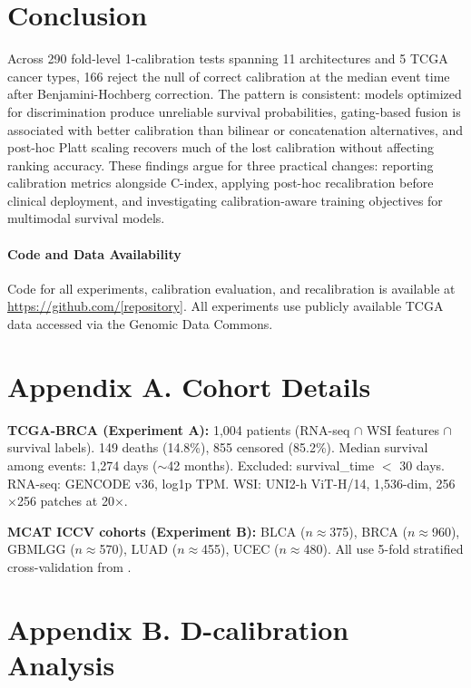 \documentclass[pmlr]{jmlr}
\begin{document}
\section{Conclusion}

Across 290 fold-level 1-calibration tests spanning 11 architectures and 5 TCGA cancer types, 166 reject the null of correct calibration at the median event time after Benjamini-Hochberg correction. The pattern is consistent: models optimized for discrimination produce unreliable survival probabilities, gating-based fusion is associated with better calibration than bilinear or concatenation alternatives, and post-hoc Platt scaling recovers much of the lost calibration without affecting ranking accuracy. These findings argue for three practical changes: reporting calibration metrics alongside C-index, applying post-hoc recalibration before clinical deployment, and investigating calibration-aware training objectives for multimodal survival models.

\paragraph{Code and Data Availability}
Code for all experiments, calibration evaluation, and recalibration is available at \url{https://github.com/[repository]}. All experiments use publicly available TCGA data accessed via the Genomic Data Commons.



\appendix
\section*{Appendix A. Cohort Details}

\textbf{TCGA-BRCA (Experiment A):} 1,004 patients (RNA-seq $\cap$ WSI features $\cap$ survival labels). 149 deaths (14.8\%), 855 censored (85.2\%). Median survival among events: 1,274 days ($\sim$42 months). Excluded: survival\_time $<$ 30 days. RNA-seq: GENCODE v36, log1p TPM. WSI: UNI2-h ViT-H/14, 1,536-dim, 256$\times$256 patches at 20$\times$.

\textbf{MCAT ICCV cohorts (Experiment B):} BLCA ($n$$\approx$375), BRCA ($n$$\approx$960), GBMLGG ($n$$\approx$570), LUAD ($n$$\approx$455), UCEC ($n$$\approx$480). All use 5-fold stratified cross-validation from \citet{chen2021multimodal}.

\section*{Appendix B. D-calibration Analysis}
\end{document}
